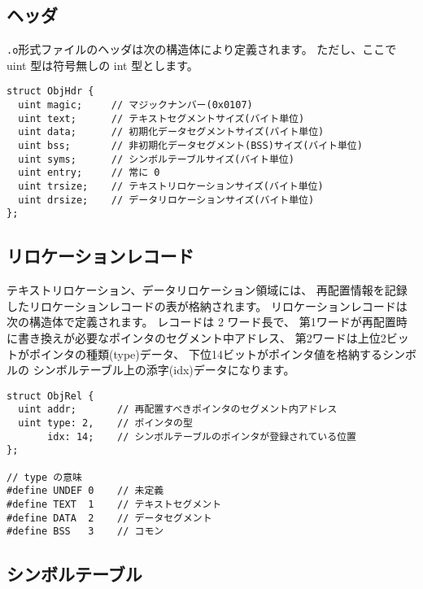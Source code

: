 \subsection{ヘッダ}

{\tt .o}形式ファイルのヘッダは次の構造体により定義されます。
ただし、ここで uint 型は符号無しの int 型とします。

\begin{mylist}
\begin{verbatim}
struct ObjHdr {
  uint magic;     // マジックナンバー(0x0107)
  uint text;      // テキストセグメントサイズ(バイト単位)
  uint data;      // 初期化データセグメントサイズ(バイト単位)
  uint bss;       // 非初期化データセグメント(BSS)サイズ(バイト単位)
  uint syms;      // シンボルテーブルサイズ(バイト単位)
  uint entry;     // 常に 0
  uint trsize;    // テキストリロケーションサイズ(バイト単位)
  uint drsize;    // データリロケーションサイズ(バイト単位)
};
\end{verbatim}
\end{mylist}

\subsection{リロケーションレコード}

テキストリロケーション、データリロケーション領域には、
再配置情報を記録したリロケーションレコードの表が格納されます。
リロケーションレコードは次の構造体で定義されます。
レコードは 2 ワード長で、
第1ワードが再配置時に書き換えが必要なポインタのセグメント中アドレス、
第2ワードは上位2ビットがポインタの種類(type)データ、
下位14ビットがポインタ値を格納するシンボルの
シンボルテーブル上の添字(idx)データになります。

\begin{mylist}
\begin{verbatim}
struct ObjRel {
  uint addr;       // 再配置すべきポインタのセグメント内アドレス
  uint type: 2,    // ポインタの型
       idx: 14;    // シンボルテーブルのポインタが登録されている位置
};

// type の意味
#define UNDEF 0    // 未定義
#define TEXT  1    // テキストセグメント
#define DATA  2    // データセグメント
#define BSS   3    // コモン
\end{verbatim}
\end{mylist}

\subsection{シンボルテーブル}

